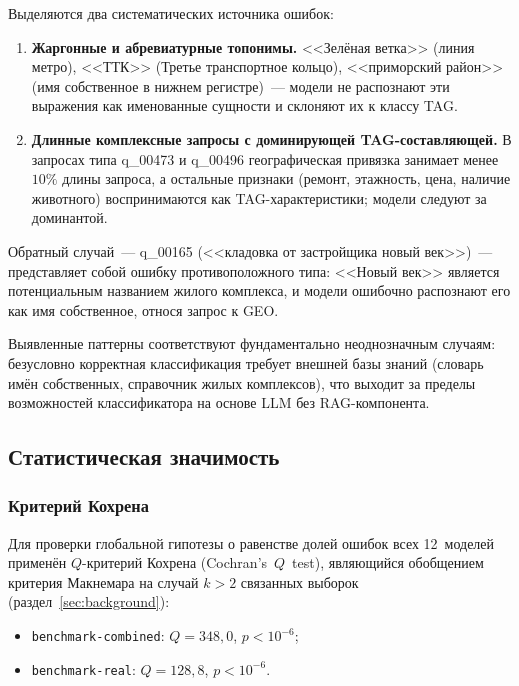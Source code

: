 Выделяются два систематических источника ошибок:
\begin{enumerate}
    \item \textbf{Жаргонные и абревиатурные топонимы.} <<Зелёная ветка>> (линия метро), <<ТТК>> (Третье транспортное кольцо), <<приморский район>> (имя собственное в нижнем регистре)~--- модели не распознают эти выражения как именованные сущности и склоняют их к классу TAG.
    \item \textbf{Длинные комплексные запросы с доминирующей TAG-составляющей.} В запросах типа q\_00473 и q\_00496 географическая привязка занимает менее $10\%$ длины запроса, а остальные признаки (ремонт, этажность, цена, наличие животного) воспринимаются как TAG-характеристики; модели следуют за доминантой.
\end{enumerate}

Обратный случай~--- q\_00165 (<<кладовка от застройщика новый век>>)~--- представляет собой ошибку противоположного типа: <<Новый век>> является потенциальным названием жилого комплекса, и модели ошибочно распознают его как имя собственное, относя запрос к GEO.

Выявленные паттерны соответствуют фундаментально неоднозначным случаям: безусловно корректная классификация требует внешней базы знаний (словарь имён собственных, справочник жилых комплексов), что выходит за пределы возможностей классификатора на основе LLM без RAG-компонента.

\subsection{Статистическая значимость} \label{subsec:significance}

\subsubsection{Критерий Кохрена}

Для проверки глобальной гипотезы о равенстве долей ошибок всех 12~моделей применён $Q$-критерий Кохрена (Cochran's~$Q$~test), являющийся обобщением критерия Макнемара на случай $k > 2$ связанных выборок (раздел~\ref{sec:background}):

\begin{itemize}
    \item \texttt{benchmark-combined}: $Q = 348{,}0$, $p < 10^{-6}$;
    \item \texttt{benchmark-real}: $Q = 128{,}8$, $p < 10^{-6}$.
\end{itemize}

